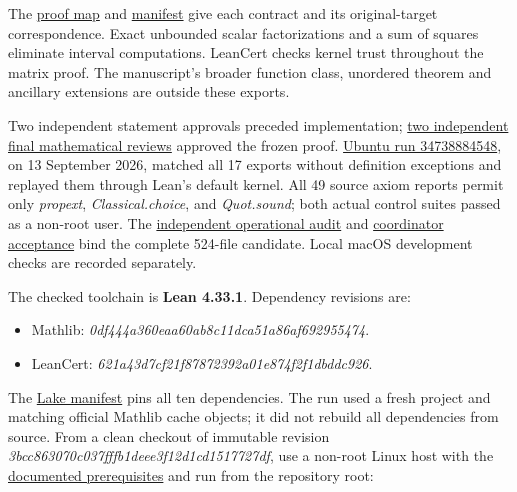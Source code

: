 \documentclass[11pt,a4paper]{article}
\providecommand{\tightlist}{\setlength{\itemsep}{0pt}\setlength{\parskip}{0pt}}
\begin{document}
The
\href{https://github.com/ajt60gaibb/OpenProblemsInNLA/blob/main/randomized-and-low-rank-approximation/RA-09/lean/PROOF_MAP.md}{proof
map} and
\href{https://github.com/ajt60gaibb/OpenProblemsInNLA/blob/main/randomized-and-low-rank-approximation/RA-09/lean/formalization.yaml}{manifest}
give each contract and its original-target correspondence. Exact
unbounded scalar factorizations and a sum of squares eliminate interval
computations. LeanCert checks kernel trust throughout the matrix proof.
The manuscript's broader function class, unordered theorem and ancillary
extensions are outside these exports.

Two independent statement approvals preceded implementation;
\href{https://github.com/ajt60gaibb/OpenProblemsInNLA/blob/main/randomized-and-low-rank-approximation/RA-09/lean/README.md\#reviewed-evidence}{two
independent final mathematical reviews} approved the frozen proof.
\href{https://github.com/sgstepaniants/OpenProblemsInNLA/actions/runs/34738884548}{Ubuntu
run 34738884548}, on 13 September 2026, matched all 17 exports without
definition exceptions and replayed them through Lean's default kernel.
All 49 source axiom reports permit only \textit{propext},
\textit{Classical.choice}, and \textit{Quot.sound}; both actual control
suites passed as a non-root user. The
\href{https://github.com/ajt60gaibb/OpenProblemsInNLA/blob/main/randomized-and-low-rank-approximation/RA-09/lean/verification/linux-2026-09-13/OPERATIONAL-REVIEW.md}{independent
operational audit} and
\href{https://github.com/ajt60gaibb/OpenProblemsInNLA/blob/main/randomized-and-low-rank-approximation/RA-09/lean/verification/root-operational-2026-09-13/ROOT-CHECKS.json}{coordinator
acceptance} bind the complete 524-file candidate. Local macOS
development checks are recorded separately.

The checked toolchain is \textbf{Lean 4.33.1}. Dependency revisions are:

\begin{itemize}
\tightlist
\item
  Mathlib: \textit{0df444a360eaa60ab8c11dca51a86af692955474}.
\item
  LeanCert: \textit{621a43d7cf21f87872392a01e874f2f1dbddc926}.
\end{itemize}

The
\href{https://github.com/ajt60gaibb/OpenProblemsInNLA/blob/main/randomized-and-low-rank-approximation/RA-09/lean/lake-manifest.json}{Lake
manifest} pins all ten dependencies. The run used a fresh project and
matching official Mathlib cache objects; it did not rebuild all
dependencies from source. From a clean checkout of immutable revision
\textit{3bcc863070c037fffb1deee3f12d1cd1517727df}, use a non-root Linux
host with the
\href{https://github.com/ajt60gaibb/OpenProblemsInNLA/blob/main/tools/lean/HARNESS.md}{documented
prerequisites} and run from the repository root:
\end{document}
